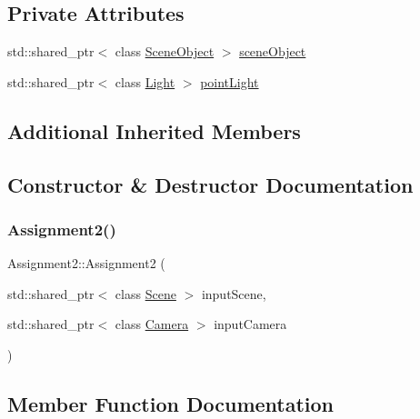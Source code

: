 \subsection*{Private Attributes}
\begin{DoxyCompactItemize}
\item 
std\+::shared\+\_\+ptr$<$ class \hyperlink{class_scene_object}{Scene\+Object} $>$ \hyperlink{class_assignment2_a3afcc7cf71f0b1eb855482057beb1146}{scene\+Object}
\item 
std\+::shared\+\_\+ptr$<$ class \hyperlink{class_light}{Light} $>$ \hyperlink{class_assignment2_abaf6127e0de097717673c0d9b04f8c79}{point\+Light}
\end{DoxyCompactItemize}
\subsection*{Additional Inherited Members}


\subsection{Constructor \& Destructor Documentation}
\hypertarget{class_assignment2_ac684d2ecb894a4e71f8359e3a2ebd37f}{}\label{class_assignment2_ac684d2ecb894a4e71f8359e3a2ebd37f} 
\subsubsection{\texorpdfstring{Assignment2()}{Assignment2()}}
{\footnotesize\ttfamily Assignment2\+::\+Assignment2 (\begin{DoxyParamCaption}\item[{std\+::shared\+\_\+ptr$<$ class \hyperlink{class_scene}{Scene} $>$}]{input\+Scene,  }\item[{std\+::shared\+\_\+ptr$<$ class \hyperlink{class_camera}{Camera} $>$}]{input\+Camera }\end{DoxyParamCaption})}



\subsection{Member Function Documentation}
\hypertarget{class_assignment2_ae4f0035275d5be2c053a598fbe3209e6}{}\label{class_assignment2_ae4f0035275d5be2c053a598fbe3209e6} 
